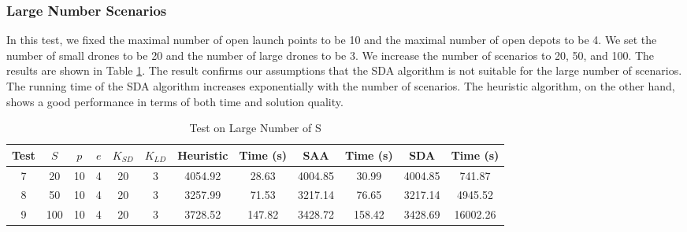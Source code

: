 \documentclass[preprint,review,11pt,authoryear]{elsarticle}
\begin{document}
\subsubsection{Large Number Scenarios} \label{subsubsec:large_scenarios}
In this test, we fixed the maximal number of open launch points to be 10 and the maximal number of open depots to be 4. We set the number of small drones to be 20 and the number of large drones to be 3. We increase the number of scenarios to 20, 50, and 100. The results are shown in Table \ref{tab:large_scenario}. The result confirms our assumptions that the SDA algorithm is not suitable for the large number of scenarios. The running time of the SDA algorithm increases exponentially with the number of scenarios. The heuristic algorithm, on the other hand, shows a good performance in terms of both time and solution quality. 

\begin{table}[!htp]\centering
    \caption{Test on Large Number of S}\label{tab:large_scenario}
    \scriptsize
    \begin{tabular}{|c|c|cccc|cc|cc|cc|}
    \hline
    Test &$S$ &$p$ &$e$ &$K_{SD}$ &$K_{LD}$ &Heuristic &Time (s) &SAA &Time (s) &SDA &Time (s) \\
    \hline
    7 &20 &10 &4 &20 &3 &4054.92 &28.63 &4004.85 &30.99 &4004.85 &741.87 \\
    8 &50 &10 &4 &20 &3 &3257.99 &71.53 &3217.14 &76.65 &3217.14 &4945.52 \\
    9 &100 &10 &4 &20 &3 &3728.52 &147.82 &3428.72 &158.42 &3428.69 &16002.26 \\
    \hline
    \end{tabular}
\end{table}
\end{document}
